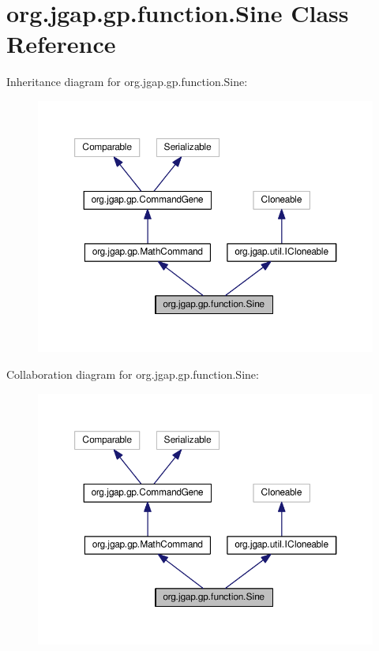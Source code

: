 \hypertarget{classorg_1_1jgap_1_1gp_1_1function_1_1_sine}{\section{org.\-jgap.\-gp.\-function.\-Sine Class Reference}
\label{classorg_1_1jgap_1_1gp_1_1function_1_1_sine}
}


Inheritance diagram for org.\-jgap.\-gp.\-function.\-Sine\-:
\nopagebreak
\begin{figure}[H]
\begin{center}
\leavevmode
\includegraphics[width=350pt]{classorg_1_1jgap_1_1gp_1_1function_1_1_sine__inherit__graph}
\end{center}
\end{figure}


Collaboration diagram for org.\-jgap.\-gp.\-function.\-Sine\-:
\nopagebreak
\begin{figure}[H]
\begin{center}
\leavevmode
\includegraphics[width=350pt]{classorg_1_1jgap_1_1gp_1_1function_1_1_sine__coll__graph}
\end{center}
\end{figure}
